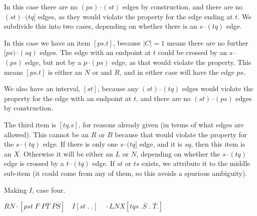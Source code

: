 In this case there are no $(ps)$--$(st)$ edges by construction, and there are no $(st)$--$(tq]$ edges, as they would violate the \oneEC property for the edge ending at $t$.
We subdivide this into two cases, depending on whether there is an $s$--$(tq)$ edge.

\begin{center}
\end{center}

In this case we have an item $[ps.t]$, because $|C| = 1$ means there are no further $[ps)$--$(sq)$ edges.
The edge with an endpoint at $t$ could be crossed by an $s$--$(ps)$ edge, but not by a $p$--$(ps)$ edge, as that would violate the \oneEC property.
This means $[ps.t]$ is either an $N$ or and $R$, and in either case will have the edge $ps$.

We also have an interval, $[st]$, because any $(st)$--$(tq)$ edges would violate the \oneEC property for the edge with an endpoint at $t$, and there are no $(st)$--$(ps)$ edges by construction.

The third item is $[tq.s]$, for reasons already given (in terms of what edges are allowed).
This cannot be an $R$ or $B$ because that would violate the \oneEC property for the $s$--$(tq)$ edge.
If there is only one $s$--$(tq]$ edge, and it is $sq$, then this item is an $X$.
Otherwise it will be either an $L$ or $N$, depending on whether the $s$--$(tq)$ edge is crossed by a $t$--$(tq)$ edge.
If $st$ or $ts$ exists, we attribute it to the middle sub-item (it could come from any of them, so this avoids a spurious ambiguity).

\begin{finalEquation}
\caption{\label{alg:I:4}Making $I$, case four.}
  $RN\cdotp [pst \; F \; P\overline{T} \; \overline{PS}] \quad I[st \; . \; .] \quad \cdotp LNX[tqs \; .\overline{S} \; . \; \overline{T}.]$
\end{finalEquation}

